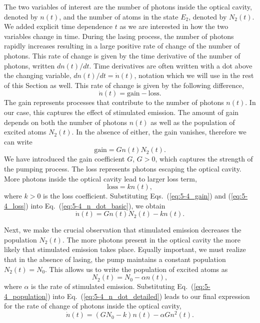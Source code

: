 The two variables of interest are the number of photons inside the optical cavity, denoted by $n(t)$, and the number of atoms in the state $E_2$, denoted by $N_2(t)$.
We added explicit time dependence $t$ as we are interested in how the two variables change in time.
During the lasing process, the number of photons rapidly increases resulting in a large positive rate of change of the number of photons.
This rate of change is given by the time derivative of the number of photons, written $dn(t)/dt$.
Time derivatives are often written with a dot above the changing variable, $dn(t)/dt = \dot{n}(t)$, notation which we will use in the rest of this Section as well.
This rate of change is given by the following difference,
\begin{equation}
    \dot{n}(t) = \text{gain} - \text{loss}.
    \label{eq:5-4_n_dot_basic}
\end{equation}
The gain represents processes that contribute to the number of photons $n(t)$.
In our case, this captures the effect of stimulated emission.
The amount of gain depends on both the number of photons $n(t)$ as well as the population of excited atoms $N_2(t)$.
In the absence of either, the gain vanishes, therefore we can write
\begin{equation}
    \text{gain} = G n (t) N_2(t).
    \label{eq:5-4_gain}
\end{equation}
We have introduced the gain coefficient $G$, $G>0$, which captures the strength of the pumping process.
The loss represents photons escaping the optical cavity.
More photons inside the optical cavity lead to larger loss term,
\begin{equation}
    \text{loss} = k n(t),
    \label{eq:5-4_loss}
\end{equation}
where $k>0$ is the loss coefficient.
Substituting Eqs.~(\ref{eq:5-4_gain}) and (\ref{eq:5-4_loss}) into Eq.~(\ref{eq:5-4_n_dot_basic}), we obtain
\begin{equation}
    \dot{n}(t) = G n(t) N_2(t) - k n(t).
    \label{eq:5-4_n_dot_detailed}
\end{equation}

Next, we make the crucial observation that stimulated emission decreases the population $N_2(t)$.
The more photons present in the optical cavity the more likely that stimulated emission takes place.
Equally important, we must realize that in the absence of lasing, the pump maintains a constant population $N_2(t) = N_0$.
This allows us to write the population of excited atoms as
\begin{equation}
    N_2(t) = N_0 - \alpha n(t),
    \label{eq:5-4_population}
\end{equation}
where $\alpha$ is the rate of stimulated emission.
Substituting Eq.~(\ref{eq:5-4_population}) into Eq.~(\ref{eq:5-4_n_dot_detailed}) leads to our final expression for the rate of change of photons inside the optical cavity,
\begin{equation}
    \dot{n}(t) = (G N_0 - k) n(t) - \alpha G n^2(t).
    \label{eq:5-4_n_dot_final}
\end{equation}

